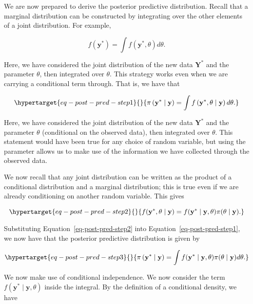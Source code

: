 \documentclass[
  letterpaper,
  DIV=11,
  numbers=noendperiod]{scrreprt}
\theoremstyle{definition}
\theoremstyle{definition}
\theoremstyle{plain}
\theoremstyle{remark}
\begin{document}
We are now prepared to derive the posterior predictive distribution.
Recall that a marginal distribution can be constructed by integrating
over the other elements of a joint distribution. For example,

\[f\left(\mathbf{y}^*\right) = \int f\left(\mathbf{y}^*, \theta\right) d\theta.\]

Here, we have considered the joint distribution of the new data
\(\mathbf{Y}^*\) and the parameter \(\theta\), then integrated over
\(\theta\). This strategy works even when we are carrying a conditional
term through. That is, we have that

\begin{equation}\protect\hypertarget{eq-post-pred-step1}{}{\pi\left(\mathbf{y}^* \mid \mathbf{y}\right) = \int f\left(\mathbf{y}^*, \theta \mid \mathbf{y}\right) d\theta.}\label{eq-post-pred-step1}\end{equation}

Here, we have considered the joint distribution of the new data
\(\mathbf{Y}^*\) and the parameter \(\theta\) (conditional on the
observed data), then integrated over \(\theta\). This statement would
have been true for any choice of random variable, but using the
parameter allows us to make use of the information we have collected
through the observed data.

We now recall that any joint distribution can be written as the product
of a conditional distribution and a marginal distribution; this is true
even if we are already conditioning on another random variable. This
gives

\begin{equation}\protect\hypertarget{eq-post-pred-step2}{}{f(\mathbf{y}^*, \theta \mid \mathbf{y}) = f(\mathbf{y}^* \mid \mathbf{y}, \theta) \pi(\theta \mid \mathbf{y}).}\label{eq-post-pred-step2}\end{equation}

Substituting Equation~\ref{eq-post-pred-step2} into
Equation~\ref{eq-post-pred-step1}, we now have that the posterior
predictive distribution is given by

\begin{equation}\protect\hypertarget{eq-post-pred-step3}{}{\pi\left(\mathbf{y}^* \mid \mathbf{y}\right) = \int f(\mathbf{y}^* \mid \mathbf{y}, \theta) \pi(\theta \mid \mathbf{y}) d\theta.}\label{eq-post-pred-step3}\end{equation}

We now make use of conditional independence. We now consider the term
\(f(\mathbf{y}^* \mid \mathbf{y}, \theta)\) inside the integral. By the
definition of a conditional density, we have
\end{document}
